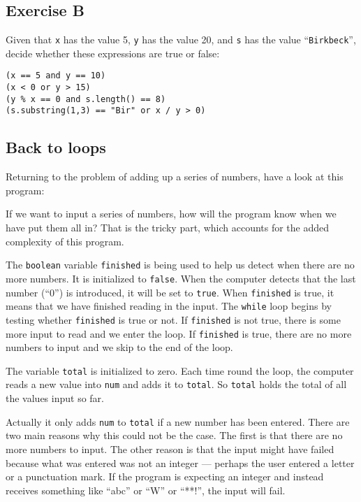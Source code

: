 \subsection*{Exercise B}

Given that \texttt{x} has the value 5, \texttt{y} has the value 20,
and \texttt{s} has the value ``\texttt{Birkbeck}'', decide whether these
expressions are true or false:

\begin{Verbatim}
(x == 5 and y == 10)
(x < 0 or y > 15)
(y % x == 0 and s.length() == 8)
(s.substring(1,3) == "Bir" or x / y > 0)
\end{Verbatim}

\subsection{Back to loops}

Returning to the problem of adding up a series of numbers, have a
look at this program:


If we want to input a series of numbers, how will the program know
when we have put them all in?  That is the tricky part, which accounts
for the added complexity of this program.

The \texttt{boolean} variable
\texttt{finished} is being used to help us detect when there are no more
numbers. It is initialized to \texttt{false}.  When the computer detects
that the last number (``0'') is introduced, it will be set to \texttt{true}.
When \texttt{finished} is true, it means that we have finished reading in
the input. The \texttt{while} loop begins by testing whether \texttt{finished}
is true or not.  If \texttt{finished} is not true, there is some more input
to read and we enter the loop. If \texttt{finished} is true, there are
no more numbers to input and we skip to the end of the loop.

The variable \texttt{total} is initialized to zero.
Each time round the loop, the computer reads a new value into \texttt{num}
and adds it to \texttt{total}. So \texttt{total} holds the total of all
the values input so far.

Actually it only adds  \texttt{num} to \texttt{total} if a new number
has been entered. There are two main reasons why this could not be the
case. The first is that there are no more numbers to input.
The other reason is that the input might have failed
because what was entered was not an integer --- perhaps the user entered
a letter or a punctuation mark.  If the program is expecting an integer
and instead receives something like ``abc'' or ``W'' or ``**!'', the input will fail.

